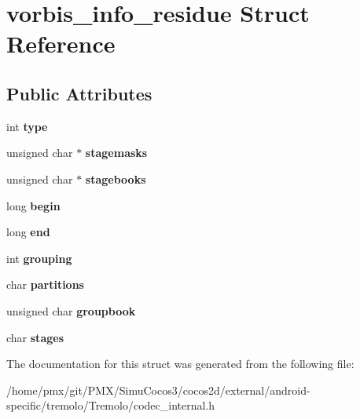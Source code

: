 \hypertarget{structvorbis__info__residue}{}\section{vorbis\+\_\+info\+\_\+residue Struct Reference}
\label{structvorbis__info__residue}
\subsection*{Public Attributes}
\begin{DoxyCompactItemize}
\item 
\mbox{\label{structvorbis__info__residue_a92d37cdfc20390a87b9aec2ff439e4a9}} 
int {\bfseries type}
\item 
\mbox{\label{structvorbis__info__residue_aaf37d54e0e2f1d9f69e088372c30e108}} 
unsigned char $\ast$ {\bfseries stagemasks}
\item 
\mbox{\label{structvorbis__info__residue_ace406b826efd4e682603e1b34a2dacb5}} 
unsigned char $\ast$ {\bfseries stagebooks}
\item 
\mbox{\label{structvorbis__info__residue_aefca5da17164b93653973a9f1b050957}} 
long {\bfseries begin}
\item 
\mbox{\label{structvorbis__info__residue_afccbd1b12facb37cc5ed3dabc0053c3a}} 
long {\bfseries end}
\item 
\mbox{\label{structvorbis__info__residue_ac8a40530eb7b068e81ea135cbcf1382d}} 
int {\bfseries grouping}
\item 
\mbox{\label{structvorbis__info__residue_af53800517bc7ce78fcce5bf6f2de9c1d}} 
char {\bfseries partitions}
\item 
\mbox{\label{structvorbis__info__residue_ace2c04d3a3ec4ae71e23885527b0c025}} 
unsigned char {\bfseries groupbook}
\item 
\mbox{\label{structvorbis__info__residue_a8cf697c3c039e363705f80ac3b6cc912}} 
char {\bfseries stages}
\end{DoxyCompactItemize}


The documentation for this struct was generated from the following file\+:\begin{DoxyCompactItemize}
\item 
/home/pmx/git/\+P\+M\+X/\+Simu\+Cocos3/cocos2d/external/android-\/specific/tremolo/\+Tremolo/codec\+\_\+internal.\+h\end{DoxyCompactItemize}
